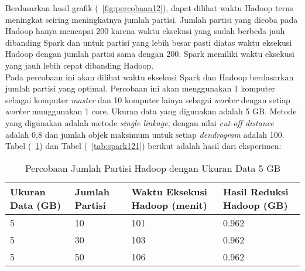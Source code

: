 Berdasarkan hasil grafik (~\ref{fig:percobaan12}), dapat dilihat waktu Hadoop terus meningkat seiring meningkatnya jumlah partisi. Jumlah partisi yang dicoba pada Hadoop hanya mencapai 200 karena waktu eksekusi yang sudah berbeda jauh dibanding Spark dan untuk partisi yang lebih besar pasti diatas waktu eksekusi Hadoop dengan jumlah partisi sama dengan 200. Spark memiliki waktu eksekusi yang jauh lebih cepat dibanding Hadoop. \\















Pada percobaan ini akan dilihat waktu eksekusi Spark dan Hadoop berdasarkan jumlah partisi yang optimal. Percobaan ini akan menggunakan 1 komputer sebagai komputer \textit{master} dan 10 komputer lainya sebagai \textit{worker} dengan setiap \textit{worker} munggunakan 1 core. Ukuran data yang digunakan adalah 5 GB. Metode yang digunakan adalah metode \textit{single linkage}, dengan nilai \textit{cut-off distance} adalah 0,8 dan jumlah objek maksimum untuk setiap \textit{dendrogram} adalah 100. Tabel (~\ref{tab:spark111}) dan Tabel (~\ref{tab:spark121}) berikut adalah hasil dari eksperimen:





\begin{table}[H] 
	\centering 
	\caption{Percobaan Jumlah Partisi Hadoop dengan Ukuran Data 5 GB}
	\label{tab:spark111}
	\begin{tabular}{|p{3cm}|p{3cm}|p{4cm}|p{4cm}|}
\hline
Ukuran Data (GB) & Jumlah Partisi &  Waktu Eksekusi Hadoop (menit) & Hasil Reduksi Hadoop (GB)\\
\hline
5 & 10 & 101  & 0.962  \\
\hline
5 & 30 & 103  & 0.962  \\
\hline
5 & 50 & 106  & 0.962   \\
\hline


\hline

	\end{tabular} 
\end{table}






